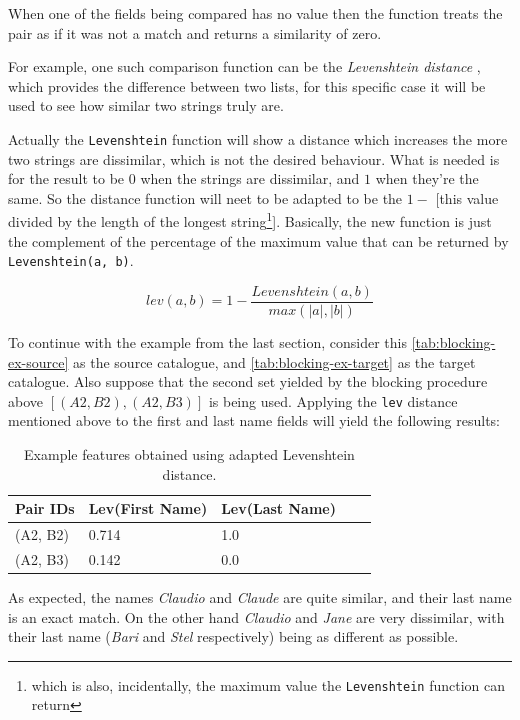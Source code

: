 \documentclass[epsfig,a4paper,11pt,titlepage,twoside,openany]{book}
\begin{document}
When one of the fields being compared has no value then the function treats the
pair as if it was not a match and returns a similarity of zero.

For example, one such comparison function can be the \textit{Levenshtein distance} \cite{levenshtein1966binary}, which provides the difference between two lists, for this specific case it will be used to see how similar two strings truly are. 

Actually the \texttt{Levenshtein} function will show a distance which increases the more two strings are dissimilar, which is not the desired behaviour. What is needed is for the result to be $0$ when the strings are dissimilar, and $1$ when they're the same. So the distance function will neet to be adapted to be the $1 -$ [this value divided by the length of the longest string\footnote{which is also, incidentally, the maximum value the \texttt{Levenshtein} function can return}]. Basically, the new function is just the complement of the percentage of the maximum value that can be returned by \texttt{Levenshtein(a, b)}.

$$
lev(a,b) = 1 - \frac{Levenshtein(a, b)}{max(|a|, |b|)}
$$

To continue with the example from the last section, consider this \autoref{tab:blocking-ex-source} as the source catalogue, and \autoref{tab:blocking-ex-target} as the target catalogue. Also suppose that the second
set yielded by the blocking procedure above $[(A2, B2), (A2, B3)]$ is being used. Applying the
\texttt{lev} distance mentioned above to the first and last name fields will
yield the following results:

\begin{table}[H]
  \centering
  \begin{tabular}{l|l|l|l|l}
    Pair IDs & Lev(First Name) & Lev(Last Name) \\ \hline
    (A2, B2) & 0.714           & 1.0            \\
    (A2, B3) & 0.142           & 0.0           
  \end{tabular}
  \caption{Example features obtained using adapted Levenshtein distance.}
  \label{tab:ex-feature-levens}
\end{table}

As expected, the names \textit{Claudio} and \textit{Claude} are quite similar,
and their last name is an exact match. On the other hand \textit{Claudio} and
\textit{Jane} are very dissimilar, with their last name (\textit{Bari} and
\textit{Stel} respectively) being as different as possible.
\end{document}
